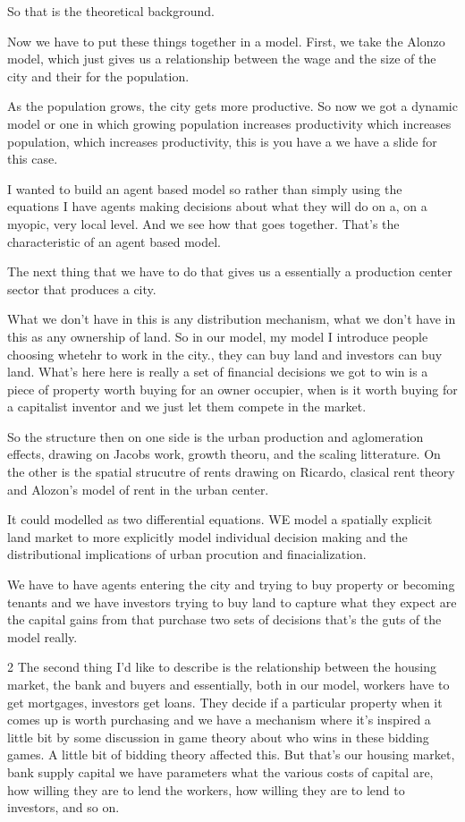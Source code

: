 \documentclass[]{article}
\begin{document}
So that is the theoretical background.

Now we have to put these things together in a model.
First, we take the Alonzo model, which just gives us a relationship between the wage and the size of the city and their for the population.

As the population grows, the city gets more productive. So now we got a dynamic model or one in which growing population increases productivity which increases population, which increases productivity, this is you have a we have a slide for this case.

I wanted to build an agent based model so rather than simply using the equations I have agents making decisions about what they will do on a, on a myopic, very local level. And we see how that goes together. That's the characteristic of an agent based model.

The next thing that we have to do that gives us a essentially a production center sector that produces a city.

What we don't have in this is any distribution mechanism, what we don't have in this as any ownership of land. So in our model, my model I introduce people choosing whetehr to work in the city., they can buy  land and investors can buy land. What's here here is really a set of financial decisions we got to win is a piece of property worth buying for an owner occupier, when is it worth buying for a capitalist inventor and we just let them compete in the market.

So the structure then on one side is the urban production and aglomeration effects, drawing on Jacobs work, growth theoru, and the scaling litterature. On the other is the spatial strucutre of rents drawing on Ricardo, clasical rent theory and Alozon's model of rent in the urban center. 

It could modelled as two differential equations. WE model a spatially explicit land market to more explicitly model individual decision making and the distributional implications of urban procution and finacialization. 

We have to have agents entering the city and trying to buy property or becoming tenants and we have investors trying to buy land to capture what they expect are the capital gains from that purchase two sets of decisions that's the guts of the model really.


2 The second thing I'd like to describe is the relationship between
the housing market, the bank and buyers and essentially, both in our model, workers have to get mortgages, investors get loans. They decide if a particular property when it comes up is worth purchasing and we have a mechanism where it's inspired a little bit by some discussion in game theory about who wins in these bidding games. A little bit of bidding theory affected this. But that's our housing market, bank supply capital we have parameters what the various costs of capital are, how willing they are to lend the workers, how willing they are to lend to investors, and so on.
\end{document}
